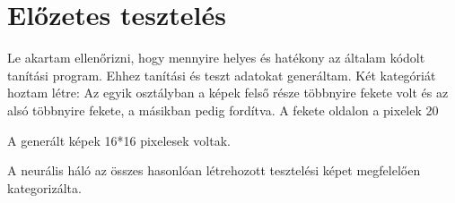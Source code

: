 \chapter{Előzetes tesztelés}\label{ch:easytest}

Le akartam ellenőrizni, hogy mennyire helyes és hatékony az általam kódolt tanítási program. Ehhez tanítási és teszt adatokat generáltam. Két kategóriát hoztam létre: Az egyik osztályban a képek felső része többnyire fekete volt és az alsó többnyire fekete, a másikban pedig fordítva. 
A fekete oldalon a pixelek 20%

A generált képek 16*16 pixelesek voltak.

A neurális háló az összes hasonlóan létrehozott tesztelési képet megfelelően kategorizálta.
